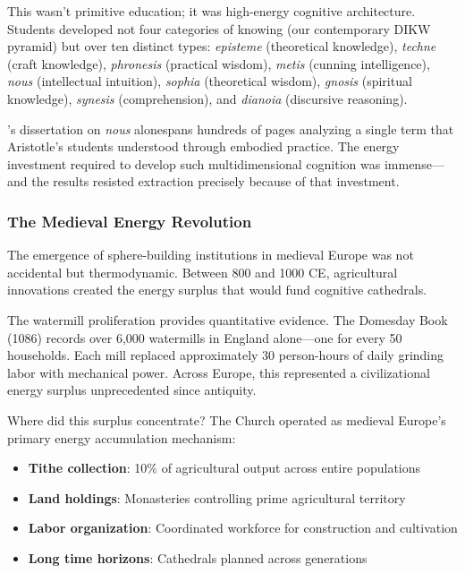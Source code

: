 This wasn't primitive education; it was high-energy cognitive architecture. Students developed not four categories of knowing (our contemporary DIKW pyramid) but over ten distinct types: \textit{episteme} (theoretical knowledge), \textit{techne} (craft knowledge), \textit{phronesis} (practical wisdom), \textit{metis} (cunning intelligence), \textit{nous} (intellectual intuition), \textit{sophia} (theoretical wisdom), \textit{gnosis} (spiritual knowledge), \textit{synesis} (comprehension), and \textit{dianoia} (discursive reasoning).

\citeauthor{erkizan1997}'s \citeyearpar{erkizan1997} dissertation on \textit{nous} alonespans hundreds of pages analyzing a single term that Aristotle's students understood through embodied practice. The energy investment required to develop such multidimensional cognition was immense---and the results resisted extraction precisely because of that investment.

\subsubsection{The Medieval Energy Revolution}

The emergence of sphere-building institutions in medieval Europe was not accidental but thermodynamic. Between 800 and 1000 CE, agricultural innovations created the energy surplus that would fund cognitive cathedrals.

The watermill proliferation provides quantitative evidence. The Domesday Book (1086) records over 6,000 watermills in England alone---one for every 50 households. Each mill replaced approximately 30 person-hours of daily grinding labor with mechanical power. Across Europe, this represented a civilizational energy surplus unprecedented since antiquity.

Where did this surplus concentrate? The Church operated as medieval Europe's primary energy accumulation mechanism:

\begin{itemize}
    \item \textbf{Tithe collection}: 10\% of agricultural output across entire populations
    \item \textbf{Land holdings}: Monasteries controlling prime agricultural territory
    \item \textbf{Labor organization}: Coordinated workforce for construction and cultivation
    \item \textbf{Long time horizons}: Cathedrals planned across generations
\end{itemize}

